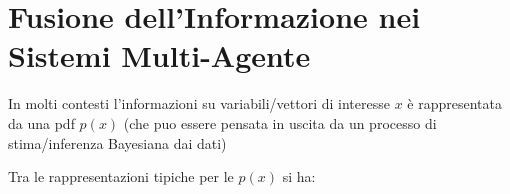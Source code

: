 \section{Fusione dell'Informazione nei Sistemi Multi-Agente}
In molti contesti l'informazioni su variabili/vettori di interesse $x$ \`e rappresentata da una pdf $p(x)$ (che puo essere pensata in uscita da un processo di stima/inferenza Bayesiana dai dati)
\begin{center}
\end{center}

Tra le rappresentazioni tipiche per le $p(x)$ si ha:


